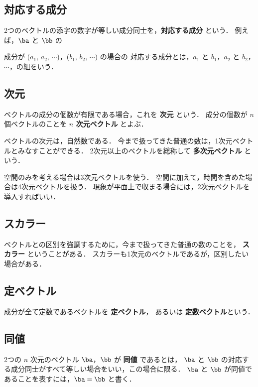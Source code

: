         \subsection{対応する成分}
        2つのベクトルの添字の数字が等しい成分同士を，\textbf{対応する成分} という．
        例えば，$\ba$ と $\bb$ の

        成分が ($a_{1},\,a_{2},\,\cdots$)，($b_{1},\,b_{2},\,\cdots$) の場合の
        対応する成分とは，$a_{1}$ と $b_{1}$，$a_{2}$ と $b_{2}$，$\cdots$，の組をいう．

        \subsection{次元}
        ベクトルの成分の個数が有限である場合，これを \textbf{次元} という．
        成分の個数が $n$ 個ベクトルのことを  \textbf{$n$ 次元ベクトル} とよぶ．

        ベクトルの次元は，自然数である．
        今まで扱ってきた普通の数は，1次元ベクトルとみなすことができる．
        2次元以上のベクトルを総称して \textbf{多次元ベクトル} という．

        空間のみを考える場合は3次元ベクトルを使う．
        空間に加えて，時間を含めた場合は4次元ベクトルを扱う．
        現象が平面上で収まる場合には，2次元ベクトルを導入すればいい．

        \subsection{スカラー}
        ベクトルとの区別を強調するために，今まで扱ってきた普通の数のことを，
        \textbf{スカラー} ということがある．
        スカラーも1次元のベクトルであるが，区別したい場合がある．

        \subsection{定ベクトル}
        成分が全て定数であるベクトルを \textbf{定ベクトル}，
        あるいは \textbf{定数ベクトル}という．

        \subsection{同値}
        2つの $n$ 次元のベクトル $\ba$，$\bb$ が \textbf{同値} であるとは，
        $\ba$ と $\bb$ の対応する成分同士がすべて等しい場合をいい，この場合に限る．
        $\ba$ と $\bb$ が同値であることを表すには，$\ba=\bb$ と書く．

